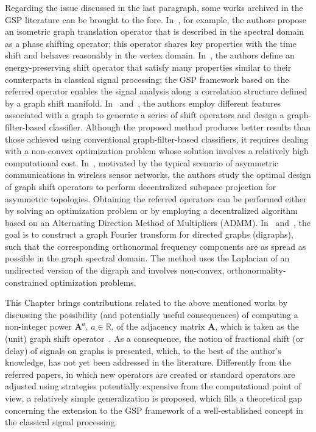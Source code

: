 {Regarding the issue discussed in the last paragraph, some works archived in the GSP literature can be brought to the fore. In~\cite{girault2015translation}, for example, the authors propose an isometric graph translation operator that is described in the spectral domain as a phase shifting operator; this operator shares key properties with the time shift and behaves reasonably in the vertex domain. In~\cite{gavili2017}, the authors define an energy-preserving shift operator that satisfy many properties similar to their counterparts in classical signal processing; the GSP framework based on the referred operator enables the signal analysis along a correlation structure defined by a graph shift manifold. In~\cite{fan20191} and~\cite{fan2019}, the authors employ different features associated with a graph to generate a series of shift operators and design a graph-filter-based classifier. Although the proposed method produces better results than those achieved using conventional graph-filter-based classifiers, it requires dealing with a non-convex optimization problem whose solution involves a relatively high computational cost. In~\cite{mollaebrahim2021}, motivated by the typical scenario of asymmetric communications in wireless sensor networks, the authors study the optimal design of graph shift operators to perform decentralized subspace projection for asymmetric topologies. Obtaining the referred operators can be performed either by solving an optimization problem or by employing a decentralized algorithm based on an Alternating Direction Method of Multipliers (ADMM). In~\cite{shafipour2018} and~\cite{shafipour2019}, the goal is to construct a graph Fourier transform for directed graphs (digraphs), such that the corresponding orthonormal frequency components are as spread as possible in the graph spectral domain. The method uses the Laplacian of an undirected version of the digraph and involves non-convex, orthonormality-constrained optimization problems.} 

{This Chapter brings contributions related to the above mentioned works by discussing the} possibility (and potentially useful consequences) of {computing} a non-integer power $\mathbf{A}^a$, $a\in\mathbb{R}$, of the adjacency matrix $\mathbf{A}$, {which is taken as} the (unit) graph shift operator~\cite{sandryhaila2014big}. {As a consequence}, the notion of fractional shift (or delay) of signals on graphs is presented, {which, to the best of the author's knowledge, has not yet been addressed in the literature. Differently from the referred papers, in which new operators are created or standard operators are adjusted using strategies potentially expensive from the computational point of view, a relatively simple generalization is proposed, which fills a theoretical gap concerning the extension to the GSP framework of a well-established concept in the classical signal processing.}

